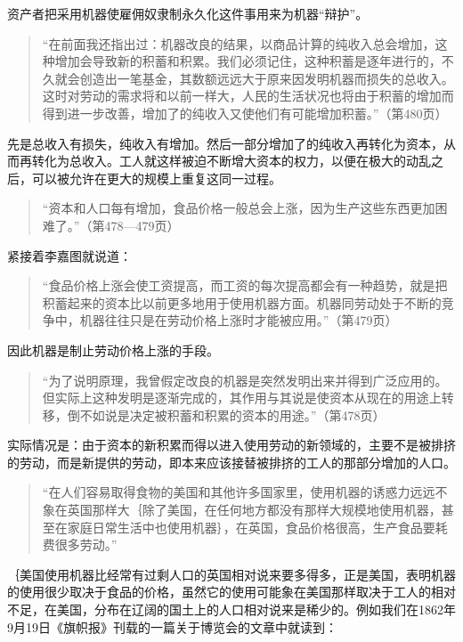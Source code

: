 资产者把采用机器使雇佣奴隶制永久化这件事用来为机器“辩护”。

\begin{quote}{“在前面我还指出过：机器改良的结果，以商品计算的纯收入总会增加，这种增加会导致新的积蓄和积累。我们必须记住，这种积蓄是逐年进行的，不久就会创造出一笔基金，其数额远远大于原来因发明机器而损失的总收入。这时对劳动的需求将和以前一样大，人民的生活状况也将由于积蓄的增加而得到进一步改善，增加了的纯收入又使他们有可能增加积蓄。”（第480页）}\end{quote}

先是总收入有损失，纯收入有增加。然后一部分增加了的纯收入再转化为资本，从而再转化为总收入。工人就这样被迫不断增大资本的权力，以便在极大的动乱之后，可以被允许在更大的规模上重复这同一过程。

\begin{quote}{“资本和人口每有增加，食品价格一般总会上涨，因为生产这些东西更加困难了。”（第478—479页）}\end{quote}

紧接着李嘉图就说道：

\begin{quote}{“食品价格上涨会使工资提高，而工资的每次提高都会有一种趋势，就是把积蓄起来的资本比以前更多地用于使用机器方面。机器同劳动处于不断的竞争中，机器往往只是在劳动价格上涨时才能被应用。”（第479页）}\end{quote}

因此机器是制止劳动价格上涨的手段。

\begin{quote}{“为了说明原理，我曾假定改良的机器是突然发明出来并得到广泛应用的。但实际上这种发明是逐渐完成的，其作用与其说是使资本从现在的用途上转移，倒不如说是决定被积蓄和积累的资本的用途。”（第478页）}\end{quote}

实际情况是：由于资本的新积累而得以进入使用劳动的新领域的，主要不是被排挤的劳动，而是新提供的劳动，即本来应该接替被排挤的工人的那部分增加的人口。

\begin{quote}{“在人们容易取得食物的美国和其他许多国家里，使用机器的诱惑力远远不象在英国那样大｛除了美国，在任何地方都没有那样大规模地使用机器，甚至在家庭日常生活中也使用机器｝，在英国，食品价格很高，生产食品要耗费很多劳动。”}\end{quote}

｛美国使用机器比经常有过剩人口的英国相对说来要多得多，正是美国，表明机器的使用很少取决于食品的价格，虽然它的使用可能象在美国那样取决于工人的相对不足，在美国，分布在辽阔的国土上的人口相对说来是稀少的。例如我们在1862年9月19日《旗帜报》刊载的一篇关于博览会的文章中就读到：


